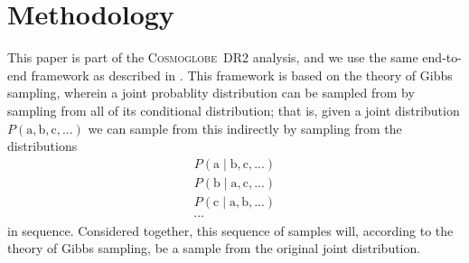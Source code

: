 \documentclass{aa}
\def\Cosmoglobe{\textsc{Cosmoglobe}}
\newcommand{\G}[0]{\tens{G}}
\renewcommand{\a}[0]{\vec{a}}
\newcommand{\dv}[0]{\vec{d}}
\begin{document}
%
%


\section{Methodology}
This paper is part of the \Cosmoglobe\ DR2 analysis, and we use the same
end-to-end framework as described in \citep{CG02_01}. This framework is based
on the theory of Gibbs sampling, wherein a joint probablity distribution can be
sampled from by sampling from all of its conditional distribution; that is,
given a joint distribution $P(\mathrm{a}, \mathrm{b}, \mathrm{c}, ...)$ we can
sample from this indirectly by sampling from the distributions
\begin{equation}
    \begin{aligned}
P(\mathrm{a} \mid \mathrm{b}, \mathrm{c}, ...) \\
P(\mathrm{b} \mid \mathrm{a}, \mathrm{c}, ...) \\
P(\mathrm{c} \mid \mathrm{a}, \mathrm{b}, ...) \\
\cdots
\end{aligned}
\end{equation}
in sequence. Considered together, this sequence of samples will, according to
the theory of Gibbs sampling, be a sample from the original joint distribution.
\end{document}
